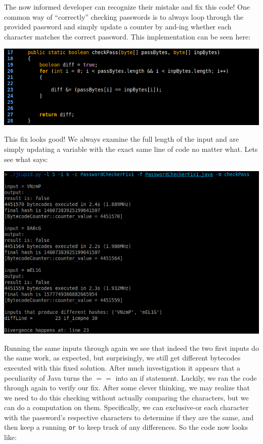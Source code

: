 The now informed developer can recognize their mistake and fix this code! One common way of ``correctly''
checking passwords is to always loop through the provided password and simply update a counter by and-ing
whether each character matches the correct password. This implementation can be seen here:

\begin{center}
  \includegraphics[width=\linewidth]{PasswordCheckerFix1}
\end{center}

This fix looks good! We always examine the full length of the input and are simply updating a variable
with the exact same line of code no matter what. Lets see what \jcupid says:

\begin{center}
  \includegraphics[width=\linewidth]{jCupidRun2}
\end{center}

Running the same inputs through again we see that indeed the two first inputs do the same work, as expected,
but surprisingly, we still get different bytecodes executed with this fixed solution. After much investigation
it appears that a peculiarity of Java turns the $==$ into an if statement. Luckily, we ran the code through
\jcupid again to verify our fix. After some clever thinking, we may realize that we need to do this checking without actually
comparing the characters, but we can do a computation on them. Specifically, we can exclusive-or each character with
the password's respective characters to
determine if they are the same, and then keep a running \texttt{or} to keep track of any differences.
So the code now looks like:

